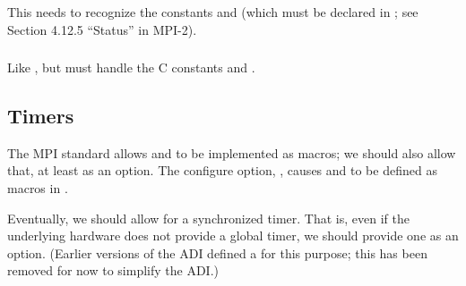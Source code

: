 \documentclass{article}
\begin{document}

\subsubsection{}
This needs to recognize the constants  and
 (which must be declared in ; see
Section 4.12.5 ``Status'' in MPI-2).  

\subsubsection{}
Like , but must handle the C constants
 and .

\subsection{Timers}
\label{sec:timer}
The MPI standard allows  and  to be
implemented as macros; we should also allow that, at least as an
option.  
The configure option, , causes
 and  to be defined as macros in
. 

Eventually, we should allow for a synchronized timer.  That is, even
if the underlying hardware does not provide a global timer, we should
provide one as an option.  (Earlier versions of the ADI defined a
 for this purpose; this has been removed for now
to simplify the ADI.)
\end{document}

